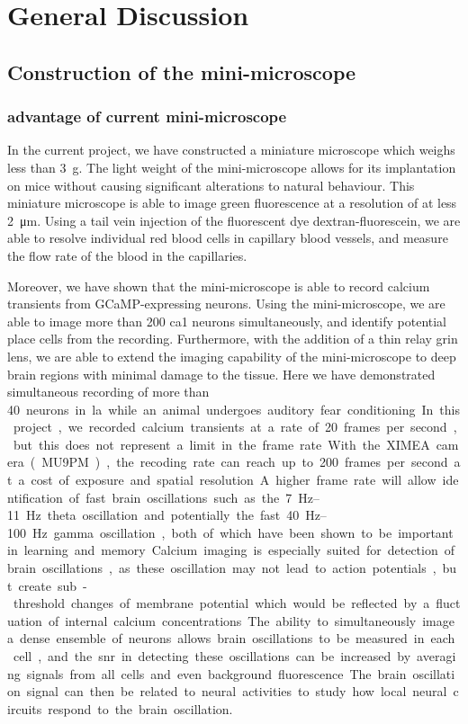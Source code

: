 \chapter{General Discussion}
\section{Construction of the mini-microscope}
\subsection{advantage of current mini-microscope}
In the current project, we have constructed a miniature microscope which weighs less than \SI{3}{\gram}. The light weight of the mini-microscope allows for its implantation on mice without causing significant alterations to natural behaviour.  This miniature microscope is able to image green fluorescence at a resolution of at less \SI{2}{\um}. Using a tail vein injection of the fluorescent dye dextran-fluorescein, we are able to resolve individual red blood cells in capillary blood vessels, and measure the flow rate of the blood in the capillaries. 

Moreover, we have shown that the mini-microscope is able to record calcium transients from GCaMP-expressing neurons. Using the mini-microscope, we are able to image more than \num{200} \gls{ca1} neurons simultaneously, and identify potential place cells from the recording. Furthermore, with the addition of a thin relay \gls{grin} lens, we are able to extend the imaging capability of the mini-microscope to deep brain regions with minimal damage to the tissue. Here we have demonstrated simultaneous recording of more than \SI{40} neurons in \gls{la} while an animal undergoes auditory fear conditioning. 

In this project, we recorded calcium transients at a rate of \num{20} frames per second, but this does not represent a limit in the frame rate. With the XIMEA camera (MU9PM), the recoding rate can reach up to \num{200} frames per second at a cost of exposure and spatial resolution. A higher frame rate will allow identification of fast brain oscillations such as the \SIrange{7}{11}{\hertz} theta oscillation and potentially the fast \SIrange{40}{100}{\hertz} gamma oscillation, both of which have been shown to be important in learning and memory. Calcium imaging is especially suited for detection of brain oscillations, as these oscillation may not lead to action potentials, but create sub-threshold changes of membrane potential which would be reflected by a fluctuation of internal calcium concentrations. The ability to simultaneously image a dense ensemble of neurons allows brain oscillations to be measured in each cell, and the \gls{snr} in detecting these oscillations can be increased by averaging signals from all cells and even background fluorescence. The brain oscillation signal can then be related to neural activities to study how local neural circuits respond to the brain oscillation. 

